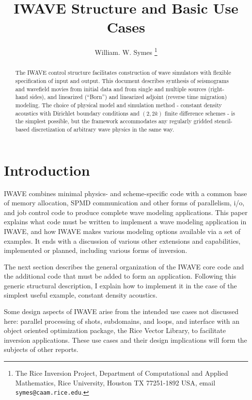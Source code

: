 \title{IWAVE Structure and Basic Use Cases}
\author{William. W. Symes \thanks{The Rice Inversion Project,
Department of Computational and Applied Mathematics, Rice University,
Houston TX 77251-1892 USA, email {\tt symes@caam.rice.edu}.}}

\maketitle
\parskip 12pt


\begin{abstract}
  The IWAVE control structure facilitates construction of wave
  simulators with flexible specification of input and output. This
  document describes synthesis of seismograms and wavefield movies
  from initial data and from single and multiple sources (right-hand
  sides), and linearized (``Born'') and linearized adjoint
  (reverse time migration) modeling. The choice of physical model and
  simulation method - constant density acoustics with Dirichlet
  boundary conditions and $(2,2k)$ finite difference schemes - is the
  simplest possible, but the framework accommodates any regularly
  gridded stencil-based discretization of arbitrary wave physics in the same way.
\end{abstract}

\section{Introduction}
IWAVE combines minimal physics- and scheme-specific code with
a common base of memory allocation, SPMD communication and other forms
of parallelism, i/o, and
job control code to produce complete wave modeling applications. This
paper explains what code must be written to implement a wave modeling
application in IWAVE, and how IWAVE makes various modeling options
available via a set of examples. It ends with a discussion of various
other extensions and capabilities, implemented or planned, including
various forms of inversion.

The next section describes the general organization of the IWAVE core
code and the additional code that must be added to form an
application. Following this generic structural description, I explain
how to implement it in the case of the simplest useful example,
constant density acoustics.

Some design aspects of IWAVE arise from the intended use cases not
discussed here: parallel processing of shots, subdomains, and loops,
and interface with an object oriented optimization package, the Rice
Vector Library, to facilitate inversion applications. These use cases
and their design implications will form the subjects of other reports.

